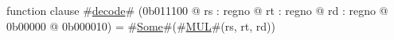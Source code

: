 function clause #\hyperref[zdecode]{decode}# (0b011100 @ rs : regno @ rt : regno @ rd : regno @ 0b00000 @ 0b000010) =
  #\hyperref[zSome]{Some}#(#\hyperref[zMUL]{MUL}#(rs, rt, rd))
